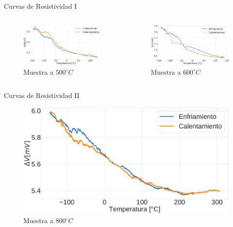 \documentclass[11pt]{beamer}
\begin{document}
			\begin{frame}[allowframebreaks]{Curvas de Resistividad I}
				\begin{columns}
					\begin{column}{.49\textwidth}
						\begin{figure}
							\includegraphics[scale=0.1]{img/Resistance_500_alt.png}
							\caption*{Muestra a $500 ^\circ C$}
						\end{figure}
					\end{column}
					\begin{column}{.49\textwidth}
						\begin{figure}
							\includegraphics[scale=0.1]{img/Resistance_600_alt.png}
							\caption*{Muestra a $600 ^\circ C$}
						\end{figure}
					\end{column}
				\end{columns}
			\end{frame}
			\begin{frame}{Curvas de Resistividad II}
				\begin{figure}
					\includegraphics[scale=0.1]{img/Resistance_800_alt.png}
					\caption*{Muestra a $800 ^\circ C$}
				\end{figure}
			\end{frame}
\end{document}
